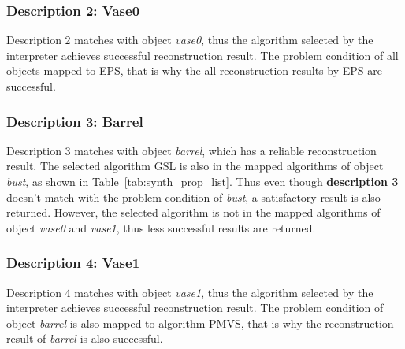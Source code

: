 \subsubsection{Description 2: Vase0}
Description 2 matches with object \textit{vase0}, thus the algorithm selected by the interpreter achieves successful reconstruction result. The problem condition of all objects mapped to EPS, that is why the all reconstruction results by EPS are successful.

\subsubsection{Description 3: Barrel}
Description 3 matches with object \textit{barrel}, which has a reliable reconstruction result. The selected algorithm GSL is also in the mapped algorithms of object \textit{bust}, as shown in Table~\ref{tab:synth_prop_list}. Thus even though \textbf{description 3} doesn't match with the problem condition of \textit{bust}, a satisfactory result is also returned. However, the selected algorithm is not in the mapped algorithms of object \textit{vase0} and \textit{vase1}, thus less successful results are returned.

\subsubsection{Description 4: Vase1}
Description 4 matches with object \textit{vase1}, thus the algorithm selected by the interpreter achieves successful reconstruction result. The problem condition of object \textit{barrel} is also mapped to algorithm PMVS, that is why the reconstruction result of \textit{barrel} is also successful.


